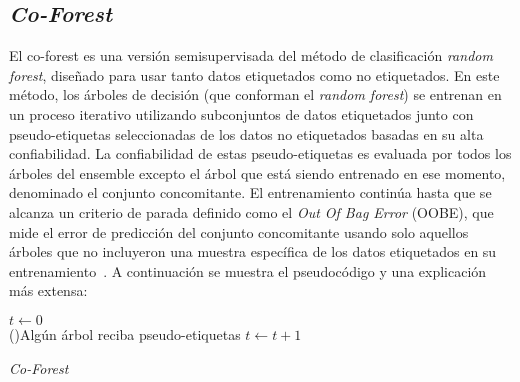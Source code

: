 \subsection{\textit{Co-Forest}}
El co-forest es una versión semisupervisada del método de clasificación \textit{random forest}, diseñado para usar tanto datos etiquetados como no etiquetados. En este método, los árboles de decisión (que conforman el \textit{random forest}) se entrenan en un proceso iterativo utilizando subconjuntos de datos etiquetados junto con pseudo-etiquetas seleccionadas de los datos no etiquetados basadas en su alta confiabilidad. La confiabilidad de estas pseudo-etiquetas es evaluada por todos los árboles del ensemble excepto el árbol que está siendo entrenado en ese momento, denominado el conjunto concomitante. El entrenamiento continúa hasta que se alcanza un criterio de parada definido como el \textit{Out Of Bag Error} (OOBE), que mide el error de predicción del conjunto concomitante usando solo aquellos árboles que no incluyeron una muestra específica de los datos etiquetados en su entrenamiento~\cite{IEEE:CoForest}. A continuación se muestra el pseudocódigo y una explicación más extensa:
\begin{algorithm}
\scriptsize
	\label{alg:Co-Forest}
	\BlankLine
	
	$t \leftarrow 0$\\
	\While(){Algún árbol reciba pseudo-etiquetas}{
		$t \leftarrow t + 1$\\
		
	}
	\caption{\textit{Co-Forest}}
\end{algorithm}

